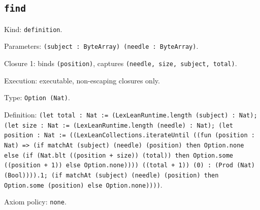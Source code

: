 \documentclass[11pt]{article}
\begin{document}
\subsection*{\texttt{find}}
\noindent Kind: \texttt{definition}.\par
\noindent Parameters: \texttt{(subject : ByteArray) (needle : ByteArray)}.\par
\noindent Closure 1: binds \texttt{(position)}, captures \texttt{(needle, size, subject, total)}.\par
\noindent Execution: executable, non-escaping closures only.\par
\noindent Type: \texttt{Option (Nat)}.\par
\noindent Definition: \texttt{(let total : Nat := (LexLeanRuntime.length (subject) : Nat); (let size : Nat := (LexLeanRuntime.length (needle) : Nat); (let position : Nat := ((LexLeanCollections.iterateUntil ((fun (position : Nat) => (if matchAt (subject) (needle) (position) then Option.none else (if (Nat.blt ((position + size)) (total)) then Option.some ((position + 1)) else Option.none)))) ((total + 1)) (0) : (Prod (Nat) (Bool)))).1; (if matchAt (subject) (needle) (position) then Option.some (position) else Option.none))))}.\par
\noindent Axiom policy: \texttt{none}.\par
\end{document}
